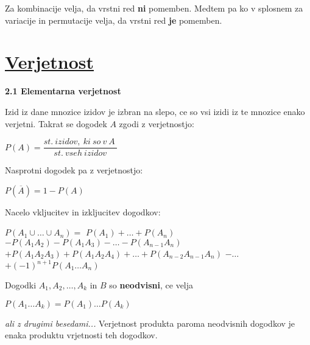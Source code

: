 \documentclass{article}
\begin{document}
\begin{multicols}{3}
\begin{small}
\begin{center}
    \end{center}        

Za kombinacije velja, da vrstni red \textbf{ni} pomemben. Medtem pa
ko v splosnem za variacije in permutacije velja, da vrstni red \textbf{je}
pomemben.
\end{small}


\section{\underline{Verjetnost}}


\textbf{2.1 Elementarna verjetnost}
\smallskip

Izid iz dane mnozice izidov je izbran na slepo, ce so vsi izidi
iz te mnozice enako verjetni. Takrat se dogodek $A$ zgodi z verjetnostjo:
\begin{center}
    \begin{math}
        P(A) = \dfrac{st.\: izidov,\: ki\: so\: v\: A\:}{st.\: vseh\: izidov}
    \end{math}    
\end{center}
Nasprotni dogodek pa z verjetnostjo:
\begin{center}
    \begin{math}
        P(\overline{A}) = 1 - P(A)
    \end{math}    
\end{center}
Nacelo vkljucitev in izkljucitev dogodkov:
\begin{center}
    \begin{small}
        \begin{math}
            P(A_{1} \cup \dots \cup A_{n}) =
        \end{math}
        \begin{math}
            P(A_{1}) + \dots + P(A_{n})
        \end{math}
        \begin{math}
            - P(A_{1} A_{2}) - P(A_{1} A_{3}) - \dots - P(A_{n - 1} A_{n})
        \end{math}
        \begin{math}
            + P(A_{1} A_{2} A_{3}) +P (A_{1} A_{2} A_{4}) + \dots + P(A_{n - 2} A_{n - 1} A_{n})
        \end{math}
        \begin{math}
            - \dots
        \end{math}
        \begin{math}
            + (-1)^{n + 1} P(A_{1} \dots A_{n})
        \end{math}
    \end{small}
\end{center}
Dogodki $A_{1}, A_{2}, \dots , A_{k}$ in $B$ so \textbf{neodvisni}, ce velja
\begin{center}
    \begin{math}
        P(A_{1} \dots A_{k}) = P(A_{1}) \dots P(A_{k})
    \end{math}
\end{center}
\textit{ali z drugimi besedami...} Verjetnost produkta paroma neodvisnih
dogodkov je enaka produktu vrjetnosti teh dogodkov.


\end{multicols}
\end{document}
